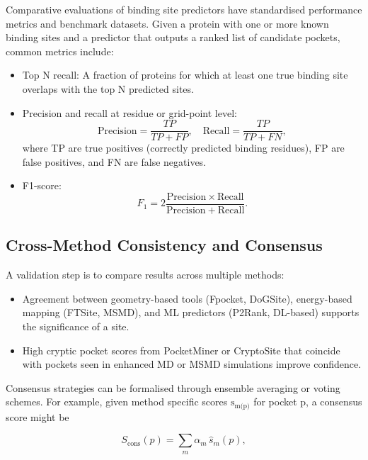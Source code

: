 \documentclass[12pt]{article}
\begin{document}
Comparative evaluations of binding site predictors have standardised performance metrics and benchmark datasets\cite{CH5_ghersi2011beyond,CH5_zhao2020exploring}. Given a protein with one or more known binding sites and a predictor that outputs a ranked list of candidate pockets, common metrics include:
\begin{itemize}
    \item Top N recall: A fraction of proteins for which at least one true binding site overlaps with the top N predicted sites.
    \item Precision and recall at residue or grid-point level:
    \begin{equation}
    \mathrm{Precision} = \frac{TP}{TP + FP}, \quad \mathrm{Recall} = \frac{TP}{TP + FN},
    \label{eq:precision_recall}
    \end{equation}
    where TP are true positives (correctly predicted binding residues), FP are false positives, and FN are false negatives.
    \item F1-score:
    \begin{equation}
    F_1 = 2 \frac{\mathrm{Precision} \times \mathrm{Recall}}{\mathrm{Precision} + \mathrm{Recall}}.
    \end{equation}

\end{itemize}

\subsection{Cross-Method Consistency and Consensus}

A validation step is to compare results across multiple methods:
\begin{itemize}
    \item Agreement between geometry-based tools (Fpocket, DoGSite), energy-based mapping (FTSite, MSMD), and ML predictors (P2Rank, DL-based) supports the significance of a site.
    \item High cryptic pocket scores from PocketMiner or CryptoSite that coincide with pockets seen in enhanced MD or MSMD simulations improve confidence.
\end{itemize}

Consensus strategies can be formalised through ensemble averaging or voting schemes. For example, given method specific scores $\textrm{s}_\textrm{m(p)}$ for pocket p, a consensus score might be

\begin{equation}
S_{\mathrm{cons}}(p) = \sum_{m} \alpha_m \, \hat{s}_m(p),
\end{equation}
\end{document}
